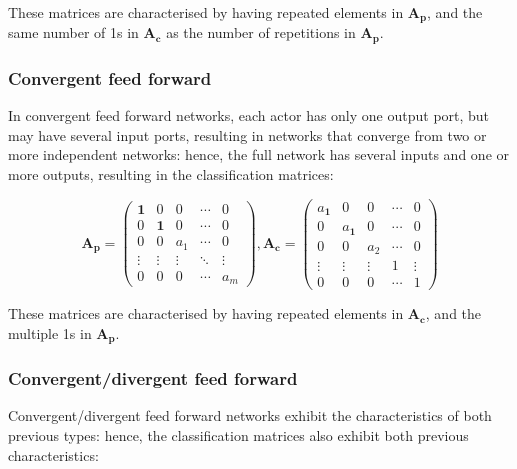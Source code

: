 These matrices are characterised by having repeated elements in $\textbf{A}_{\textbf{p}}$, and the same number of 1s in $\textbf{A}_{\textbf{c}}$ as the number of repetitions in $\textbf{A}_{\textbf{p}}$.

\subsubsection{Convergent feed forward}

In convergent feed forward networks, each actor has only one output port, but may have several input ports, resulting in networks that converge from two or more independent networks: hence, the full network has several inputs and one or more outputs, resulting in the classification matrices:

\begin{equation}
\textbf{A}_{\textbf{p}}=
\begin{pmatrix}
  \textbf{1} & 0 & 0 & \cdots & 0 \\
  0 & \textbf{1} & 0& \cdots & 0 \\
  0 & 0 & a_{1} & \cdots & 0 \\
  \vdots  & \vdots  & \vdots & \ddots & \vdots  \\
  0 & 0 & 0& \cdots & a_{m} 
 \end{pmatrix}
,
\textbf{A}_{\textbf{c}}=
\begin{pmatrix}
  a_{\textbf{1}} & 0 & 0 & \cdots & 0 \\
  0 & a_{\textbf{1}} & 0& \cdots & 0 \\
  0 & 0 & a_{2} & \cdots & 0 \\
  \vdots  & \vdots  & \vdots & 1 & \vdots  \\
  0 & 0 & 0& \cdots & 1 
 \end{pmatrix}
\end{equation} 

These matrices are characterised by having repeated elements in $\textbf{A}_{\textbf{c}}$, and the multiple 1s in $\textbf{A}_{\textbf{p}}$.

\subsubsection{Convergent/divergent feed forward}

Convergent/divergent feed forward networks exhibit the characteristics of both previous types: hence, the classification matrices also exhibit both previous characteristics:


